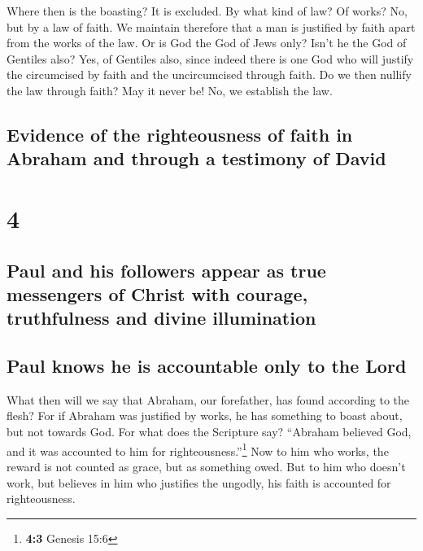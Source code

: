  Where then is the boasting? It is excluded. By what kind
of law? Of works? No, but by a law of faith.  We maintain
therefore that a man is justified by faith apart from the works of the
law.  Or is God the God of Jews only? Isn't he the God of
Gentiles also? Yes, of Gentiles also,  since indeed there
is one God who will justify the circumcised by faith and the
uncircumcised through faith.  Do we then nullify the law
through faith? May it never be! No, we establish the law.

\hypertarget{evidence-of-the-righteousness-of-faith-in-abraham-and-through-a-testimony-of-david}{%
\subsection{Evidence of the righteousness of faith in Abraham and
through a testimony of
David}\label{evidence-of-the-righteousness-of-faith-in-abraham-and-through-a-testimony-of-david}}

\hypertarget{section-3}{%
\section{4}\label{section-3}}

\hypertarget{paul-and-his-followers-appear-as-true-messengers-of-christ-with-courage-truthfulness-and-divine-illumination}{%
\subsection{Paul and his followers appear as true messengers of Christ
with courage, truthfulness and divine
illumination}\label{paul-and-his-followers-appear-as-true-messengers-of-christ-with-courage-truthfulness-and-divine-illumination}}

\hypertarget{paul-knows-he-is-accountable-only-to-the-lord}{%
\subsection{Paul knows he is accountable only to the
Lord}\label{paul-knows-he-is-accountable-only-to-the-lord}}

 What then will we say that Abraham, our forefather, has
found according to the flesh?  For if Abraham was
justified by works, he has something to boast about, but not towards
God.  For what does the Scripture say? ``Abraham believed
God, and it was accounted to him for righteousness.''\footnote{\textbf{4:3}
  Genesis 15:6}  Now to him who works, the reward is not
counted as grace, but as something owed.  But to him who
doesn't work, but believes in him who justifies the ungodly, his faith
is accounted for righteousness.

